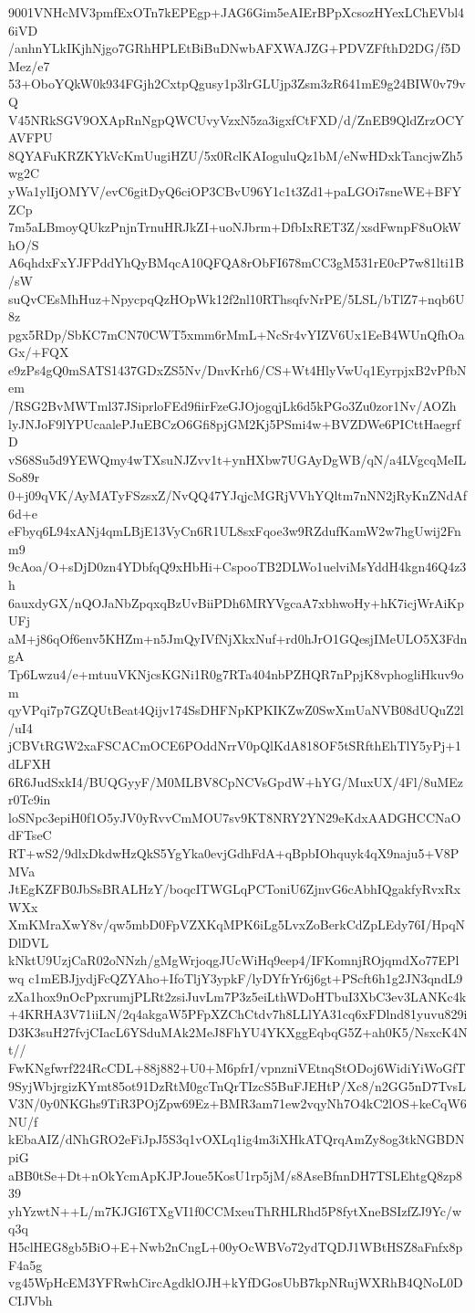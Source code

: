 9001VNHcMV3pmfExOTn7kEPEgp+JAG6Gim5eAIErBPpXcsozHYexLChEVbl46iVD
/anhnYLkIKjhNjgo7GRhHPLEtBiBuDNwbAFXWAJZG+PDVZFfthD2DG/f5DMez/e7
53+OboYQkW0k934FGjh2CxtpQgusy1p3lrGLUjp3Zsm3zR641mE9g24BIW0v79vQ
V45NRkSGV9OXApRnNgpQWCUvyVzxN5za3igxfCtFXD/d/ZnEB9QldZrzOCYAVFPU
8QYAFuKRZKYkVcKmUugiHZU/5x0RclKAIoguluQz1bM/eNwHDxkTancjwZh5wg2C
yWa1ylIjOMYV/evC6gitDyQ6ciOP3CBvU96Y1c1t3Zd1+paLGOi7sneWE+BFYZCp
7m5aLBmoyQUkzPnjnTrnuHRJkZI+uoNJbrm+DfbIxRET3Z/xsdFwnpF8uOkWhO/S
A6qhdxFxYJFPddYhQyBMqcA10QFQA8rObFI678mCC3gM531rE0cP7w81lti1B/sW
suQvCEsMhHuz+NpycpqQzHOpWk12f2nl10RThsqfvNrPE/5LSL/bTlZ7+nqb6U8z
pgx5RDp/SbKC7mCN70CWT5xmm6rMmL+NcSr4vYIZV6Ux1EeB4WUnQfhOaGx/+FQX
e9zPs4gQ0mSATS1437GDxZS5Nv/DnvKrh6/CS+Wt4HlyVwUq1EyrpjxB2vPfbNem
/RSG2BvMWTml37JSiprloFEd9fiirFzeGJOjogqjLk6d5kPGo3Zu0zor1Nv/AOZh
lyJNJoF9lYPUcaalePJuEBCzO6Gfi8pjGM2Kj5PSmi4w+BVZDWe6PICttHaegrfD
vS68Su5d9YEWQmy4wTXsuNJZvv1t+ynHXbw7UGAyDgWB/qN/a4LVgcqMeILSo89r
0+j09qVK/AyMATyFSzsxZ/NvQQ47YJqjcMGRjVVhYQltm7nNN2jRyKnZNdAf6d+e
eFbyq6L94xANj4qmLBjE13VyCn6R1UL8sxFqoe3w9RZdufKamW2w7hgUwij2Fnm9
9cAoa/O+sDjD0zn4YDbfqQ9xHbHi+CspooTB2DLWo1uelviMsYddH4kgn46Q4z3h
6auxdyGX/nQOJaNbZpqxqBzUvBiiPDh6MRYVgcaA7xbhwoHy+hK7icjWrAiKpUFj
aM+j86qOf6env5KHZm+n5JmQyIVfNjXkxNuf+rd0hJrO1GQesjIMeULO5X3FdngA
Tp6Lwzu4/e+mtuuVKNjcsKGNi1R0g7RTa404nbPZHQR7nPpjK8vphogliHkuv9om
qyVPqi7p7GZQUtBeat4Qijv174SsDHFNpKPKIKZwZ0SwXmUaNVB08dUQuZ2l/uI4
jCBVtRGW2xaFSCACmOCE6POddNrrV0pQlKdA818OF5tSRfthEhTlY5yPj+1dLFXH
6R6JudSxkI4/BUQGyyF/M0MLBV8CpNCVsGpdW+hYG/MuxUX/4Fl/8uMEzr0Tc9in
loSNpc3epiH0f1O5yJV0yRvvCmMOU7sv9KT8NRY2YN29eKdxAADGHCCNaOdFTseC
RT+wS2/9dlxDkdwHzQkS5YgYka0evjGdhFdA+qBpbIOhquyk4qX9naju5+V8PMVa
JtEgKZFB0JbSsBRALHzY/boqcITWGLqPCToniU6ZjnvG6cAbhIQgakfyRvxRxWXx
XmKMraXwY8v/qw5mbD0FpVZXKqMPK6iLg5LvxZoBerkCdZpLEdy76I/HpqNDlDVL
kNktU9UzjCaR02oNNzh/gMgWrjoqgJUcWiHq9eep4/IFKomnjROjqmdXo77EPlwq
c1mEBJjydjFcQZYAho+IfoTljY3ypkF/lyDYfrYr6j6gt+PScft6h1g2JN3qndL9
zXa1hox9nOcPpxrumjPLRt2zsiJuvLm7P3z5eiLthWDoHTbuI3XbC3ev3LANKc4k
+4KRHA3V71iiLN/2q4akgaW5PFpXZChCtdv7h8LLlYA31cq6xFDlnd81yuvu829i
D3K3suH27fvjCIacL6YSduMAk2MeJ8FhYU4YKXggEqbqG5Z+ah0K5/NsxcK4Nt//
FwKNgfwrf224RcCDL+88j882+U0+M6pfrI/vpnzniVEtnqStODoj6WidiYiWoGfT
9SyjWbjrgizKYmt85ot91DzRtM0gcTnQrTIzcS5BuFJEHtP/Xc8/n2GG5nD7TvsL
V3N/0y0NKGhs9TiR3POjZpw69Ez+BMR3am71ew2vqyNh7O4kC2lOS+keCqW6NU/f
kEbaAIZ/dNhGRO2eFiJpJ5S3q1vOXLq1ig4m3iXHkATQrqAmZy8og3tkNGBDNpiG
aBB0tSe+Dt+nOkYcmApKJPJoue5KosU1rp5jM/s8AseBfnnDH7TSLEhtgQ8zp839
yhYzwtN++L/m7KJGI6TXgVI1f0CCMxeuThRHLRhd5P8fytXneBSIzfZJ9Yc/wq3q
H5clHEG8gb5BiO+E+Nwb2nCngL+00yOcWBVo72ydTQDJ1WBtHSZ8aFnfx8pF4a5g
vg45WpHcEM3YFRwhCircAgdklOJH+kYfDGosUbB7kpNRujWXRhB4QNoL0DCIJVbh

